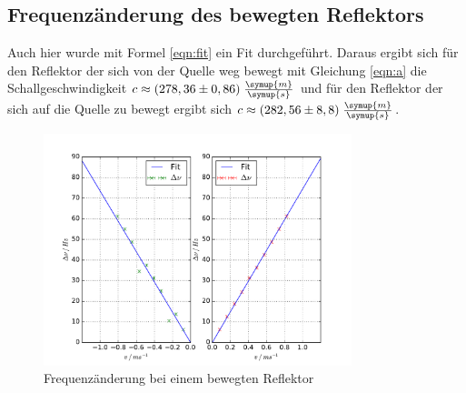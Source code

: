 \FloatBarrier
\subsection{Frequenzänderung des bewegten Reflektors}
\label{sec:fqr}
Auch hier wurde mit Formel \eqref{eqn:fit} ein Fit durchgeführt. Daraus ergibt
sich für den Reflektor der sich von der Quelle weg bewegt mit Gleichung \eqref{eqn:a}
die Schallgeschwindigkeit $c \approx ( 278,36 \pm 0,86)\; \frac{\symup{m}}{\symup{s}}$
und für den Reflektor der sich auf die Quelle zu bewegt ergibt sich
$c \approx (282,56 \pm 8,8)\; \frac{\symup{m}}{\symup{s}}$.
\begin{figure}
  \centering
  \includegraphics[width = 0.8\textwidth]{plots/eplot.pdf}
  \caption{Frequenzänderung bei einem bewegten Reflektor}
  \label{fig:e}
\end{figure}
\FloatBarrier

